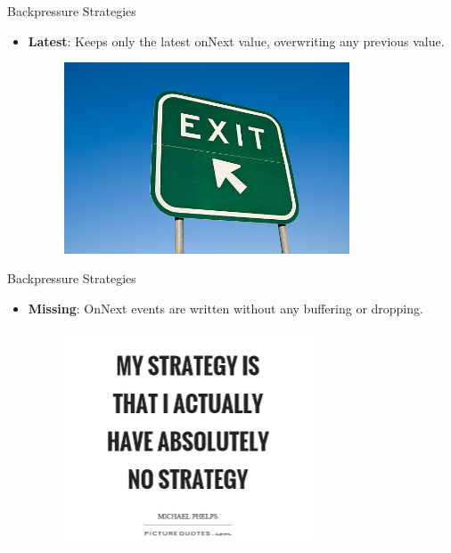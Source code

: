 \begin{frame}{Backpressure Strategies}
	\begin{itemize}
        \item \textbf{Latest}: Keeps only the latest onNext value, overwriting any previous value. %
        \begin{figure}[h]
			\includegraphics[width=0.8\textwidth,page=1]{gfx/exit.jpg}
		\end{figure}
	\end{itemize}
\end{frame}

\begin{frame}{Backpressure Strategies}
	\begin{itemize}
        \item \textbf{Missing}: OnNext events are written without any buffering or dropping. %
            \begin{figure}[h]
			\includegraphics[width=0.7\textwidth,page=1]{gfx/NoStrategy}
		\end{figure}
	\end{itemize}
\end{frame}

